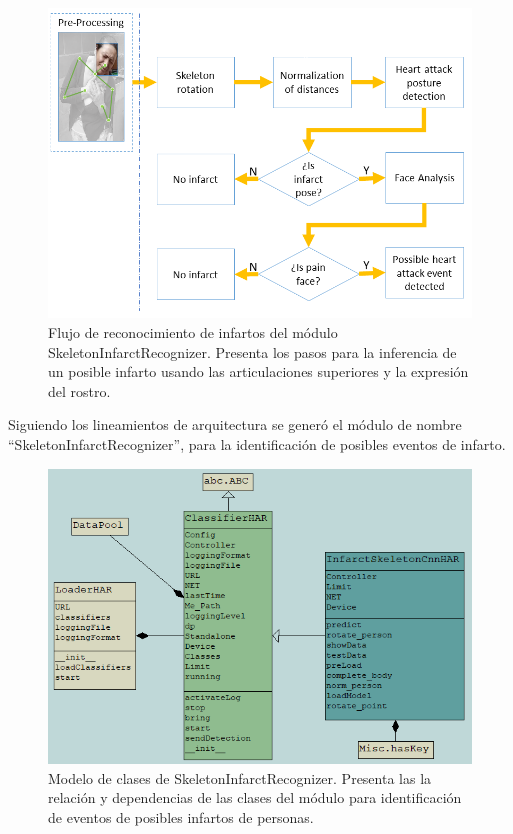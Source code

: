         \begin{figure}[ht!]
        	\centering
        	\includegraphics[width=0.9\linewidth]{imgs/04-Construction/04-Skeleton-FullProcess.png}
        	\caption[Flujo de reconocimiento de infartos del módulo SkeletonInfarctRecognizer]{Flujo de reconocimiento de infartos del módulo SkeletonInfarctRecognizer. Presenta los pasos para la inferencia de un posible infarto usando las articulaciones superiores y la expresión del rostro.}
    	    \label{fig:Skeleton-FullProcess}
        \end{figure}%
        
        Siguiendo los lineamientos de arquitectura se generó el módulo de nombre ``SkeletonInfarctRecognizer'', para la identificación de posibles eventos de infarto.
        
        \begin{figure}[ht!]
        	\centering
        	\includegraphics[width=0.9\linewidth]{imgs/04-Construction/04-HarClassModel.PNG}
        	\caption[Modelo de clases de SkeletonInfarctRecognizer]{Modelo de clases de SkeletonInfarctRecognizer. Presenta las la relación y dependencias de las clases del módulo para identificación de eventos de posibles infartos de personas.}
    	    \label{fig:InfarctSkHARClassModel}
        \end{figure}%
        
